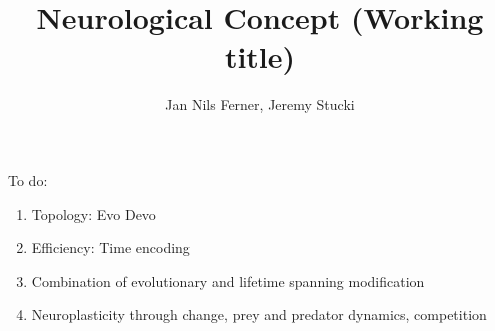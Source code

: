 \documentclass[a4paper]{article}
\title{Neurological Concept (Working title)}
\author{Jan Nils Ferner, Jeremy Stucki}
\begin{document}
\maketitle
\thispagestyle{empty}

\clearpage

\twocolumn

\begin{abstract}
	
\end{abstract}

\clearpage

\onecolumn
\tableofcontents
\twocolumn

\clearpage

To do:
\begin{enumerate}
	\item Topology: Evo Devo
	\item Efficiency: Time encoding
	\item Combination of evolutionary and lifetime spanning modification
	\item Neuroplasticity through change, prey and predator dynamics, competition
\end{enumerate}





\clearpage

\nocite{*}


\end{document}
